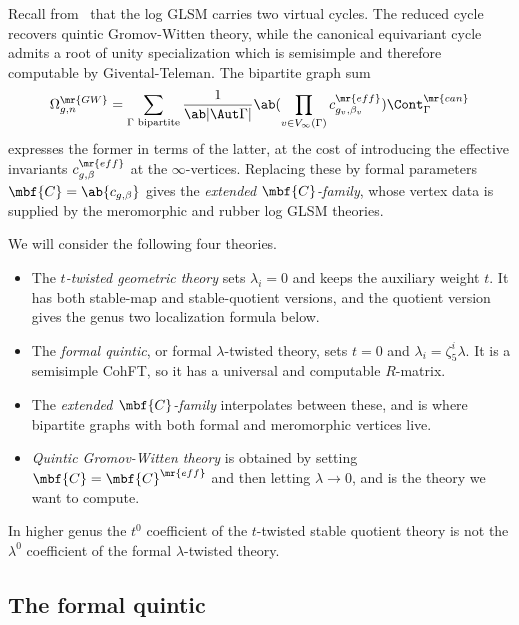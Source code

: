 Recall from~ that the log GLSM carries two virtual cycles. The reduced cycle recovers quintic Gromov-Witten theory, while the canonical equivariant cycle admits a root of unity specialization which is semisimple and therefore computable by Givental-Teleman. The bipartite graph sum
\[ \Omega^{\mr{GW}}_{g,n} = \sum_{\Gamma \text{ bipartite}} \frac{1}{\ab|\Aut \Gamma|} \ab( \prod_{v \in V_{\infty}(\Gamma)} c^{\mr{eff}}_{g_v,\beta_v}) \Cont^{\mr{can}}_{\Gamma} \]
expresses the former in terms of the latter, at the cost of introducing the effective invariants \(c^{\mr{eff}}_{g,\beta}\) at the \(\infty\)-vertices. Replacing these by formal parameters \(\mbf{C} = \ab\{c_{g,\beta}\}\) gives the \textit{extended \(\mbf{C}\)-family}, whose vertex data is supplied by the meromorphic and rubber log GLSM theories.

We will consider the following four theories.
\begin{itemize}
    \item The \textit{\(t\)-twisted geometric theory} sets \(\lambda_i = 0\) and keeps the auxiliary weight \(t\). It has both stable-map and stable-quotient versions, and the quotient version gives the genus two localization formula below.
    \item The \textit{formal quintic}, or formal \(\lambda\)-twisted theory, sets \(t = 0\) and \(\lambda_i = \zeta_5^i \lambda\). It is a semisimple CohFT, so it has a universal and computable \(R\)-matrix.
    \item The \textit{extended \(\mbf{C}\)-family} interpolates between these, and is where bipartite graphs with both formal and meromorphic vertices live.
    \item \textit{Quintic Gromov-Witten theory} is obtained by setting \(\mbf{C} = \mbf{C}^{\mr{eff}}\) and then letting \(\lambda \to 0\), and is the theory we want to compute.
\end{itemize}

\begin{warn}
    In higher genus the \(t^0\) coefficient of the \(t\)-twisted stable quotient theory is not the \(\lambda^0\) coefficient of the formal \(\lambda\)-twisted theory.
\end{warn}

\subsection{The formal quintic}%
\label{sub:The formal quintic}

